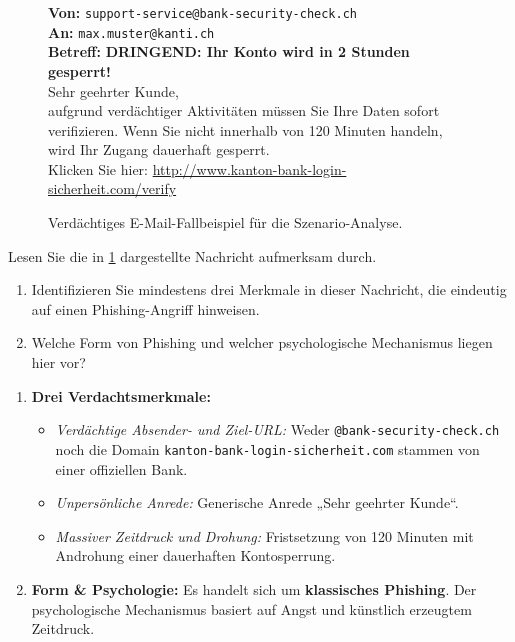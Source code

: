 \documentclass[12pt,a4paper]{article}
\begin{document}
\begin{figure}[H]
\centering
\begin{emailbox}
\textbf{Von:} \texttt{support-service@bank-security-check.ch} \\
\textbf{An:} \texttt{max.muster@kanti.ch} \\
\textbf{Betreff:} \textbf{DRINGEND: Ihr Konto wird in 2 Stunden gesperrt!} \\[0.5em]
Sehr geehrter Kunde, \\[0.5em]
aufgrund verdächtiger Aktivitäten müssen Sie Ihre Daten sofort verifizieren. \newline Wenn Sie nicht innerhalb von 120 Minuten handeln, wird Ihr Zugang dauerhaft gesperrt. \\[0.5em]
Klicken Sie hier: \url{http://www.kanton-bank-login-sicherheit.com/verify}
\end{emailbox}
\caption{Verdächtiges E-Mail-Fallbeispiel für die Szenario-Analyse.}
\label{fig:phishing_email}
\end{figure}

\newpage

\begin{taskbox}
Lesen Sie die in \cref{fig:phishing_email} dargestellte Nachricht aufmerksam durch.
\begin{enumerate}[label=\alph*)]
    \item Identifizieren Sie mindestens drei Merkmale in dieser Nachricht, die eindeutig auf einen Phishing-Angriff hinweisen.
    \item Welche Form von Phishing und welcher psychologische Mechanismus liegen hier vor?
\end{enumerate}
\end{taskbox}

\begin{solutionbox}[Musterlösung 2.3.2.2.2]
\begin{enumerate}[label=\alph*)]
    \item \textbf{Drei Verdachtsmerkmale:}
    \begin{itemize}
        \item \textit{Verdächtige Absender- und Ziel-URL:} \newline Weder \texttt{@bank-security-check.ch} noch die Domain \texttt{kanton-bank-login-sicherheit.com} stammen von einer offiziellen Bank.
        \item \textit{Unpersönliche Anrede:} Generische Anrede „Sehr geehrter Kunde“.
        \item \textit{Massiver Zeitdruck und Drohung:} Fristsetzung von 120 Minuten mit \mbox{Androhung} einer dauerhaften Kontosperrung.
    \end{itemize}
    \item \textbf{Form \& Psychologie:} Es handelt sich um \textbf{klassisches Phishing}. \newline Der psychologische Mechanismus basiert auf Angst und künstlich erzeugtem Zeitdruck.
\end{enumerate}
\end{solutionbox}
\end{document}
